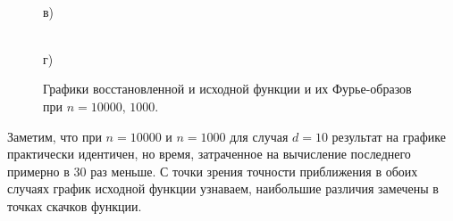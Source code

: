 \documentclass[a5paper, 10pt]{article}
\theoremstyle{definition}
\theoremstyle{plain}
\theoremstyle{remark}
\begin{document}
\begin{figure}[h!]
\begin{minipage}[h!]{0.5\linewidth}
 \\в)
\end{minipage}
\hfill
\begin{minipage}[h!]{0.5\linewidth}
 \\г)
\end{minipage}
\caption{ Графики восстановленной и исходной функции и их Фурье-образов при $n=10000, \, 1000$.}
\end{figure}

\newpage
Заметим, что при $n=10000$ и $n=1000$ для случая $d=10$ результат на графике практически идентичен, но время, затраченное на вычисление последнего примерно в 30 раз меньше. С точки зрения точности приближения в обоих случаях график исходной функции узнаваем, наибольшие различия замечены в точках скачков функции.\\
\end{document}
